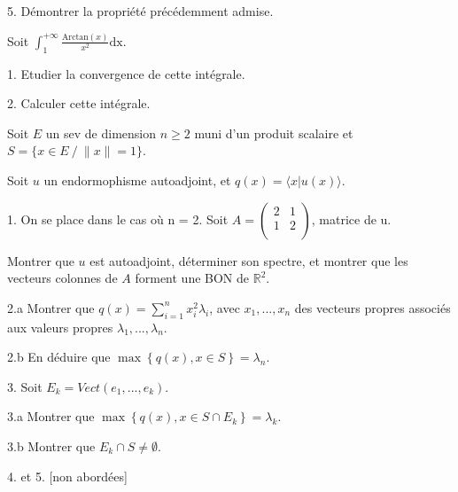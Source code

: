 \vspace{5pt}
5. Démontrer la propriété précédemment admise.



\subetoiles



\noindent Soit $\displaystyle \int_{1}^{+\infty} \frac {\mathrm{Arctan}(x)} {x^2}\mathrm{dx}$.

\vspace{5pt}
1. Etudier la convergence de cette intégrale.

\vspace{5pt}
2. Calculer cette intégrale.


\subetoiles
\columnbreak



\noindent Soit $E$ un sev de dimension $n \geqslant 2$ muni d'un produit scalaire et $S = \{x \in E \ /\ \|x\| = 1\}$.

\noindent Soit $u$ un endormophisme autoadjoint, et $q(x) = \langle x | u(x) \rangle$.

\vspace{5pt}
1. On se place dans le cas où n = 2. Soit $A =
\begin{pmatrix}
2 & 1 \\
1 & 2 \\
\end{pmatrix}
$, matrice de u.

Montrer que $u$ est autoadjoint, déterminer son spectre, et montrer que les vecteurs colonnes de $A$ forment une BON de $\mathbb{R}^2$.

\vspace{5pt}
2.a Montrer que $\displaystyle q(x) = \sum_{i = 1}^{n} x_i^2\lambda_i$,
avec $x_1, ..., x_n$ des vecteurs propres associés aux valeurs propres $\lambda_1, ..., \lambda_n$.

\vspace{5pt}
2.b En déduire que $\max\left\{q(x), x \in S\right\} = \lambda_n$.

\vspace{5pt}
3. Soit $E_k = Vect(e_1, ..., e_k)$.

\vspace{5pt}
\quad 3.a Montrer que $\max \left\{q(x), x \in S \cap E_k \right\} = \lambda_k$.

\vspace{5pt}
\quad 3.b Montrer que  $E_k \cap S \ne \emptyset$.

\vspace{5pt}
4. et 5. [non abordées]



